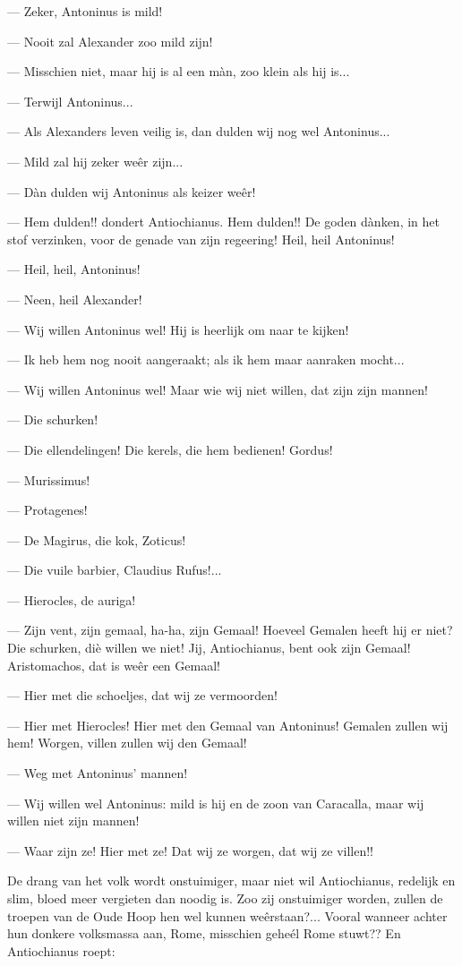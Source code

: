 \documentclass[a4paper, 12pt, oneside, dutch]{article}
\begin{document}
--- Zeker, Antoninus is mild!

--- Nooit zal Alexander zoo mild zijn!

--- Misschien niet, maar hij is al een màn, zoo klein als hij is...

--- Terwijl Antoninus...

--- Als Alexanders leven veilig is, dan dulden wij nog wel Antoninus...

--- Mild zal hij zeker weêr zijn...

--- Dàn dulden wij Antoninus als keizer weêr!

--- Hem dulden!! dondert Antiochianus. Hem dulden!! De goden dànken, in het stof verzinken, voor de genade van zijn regeering! Heil, heil Antoninus!

--- Heil, heil, Antoninus!

--- Neen, heil Alexander!

--- Wij willen Antoninus wel! Hij is heerlijk om naar te kijken!

--- Ik heb hem nog nooit aangeraakt; als ik hem maar aanraken mocht...

--- Wij willen Antoninus wel! Maar wie wij niet willen, dat zijn zijn mannen!

--- Die schurken!

--- Die ellendelingen! Die kerels, die hem bedienen! Gordus!

--- Murissimus!

--- Protagenes!

--- De Magirus, die kok, Zoticus!

--- Die vuile barbier, Claudius Rufus!...

--- Hierocles, de auriga!

--- Zijn vent, zijn gemaal, ha-ha, zijn Gemaal! Hoeveel Gemalen heeft hij er niet? Die schurken, diè willen we niet! Jij, Antiochianus, bent ook zijn Gemaal! Aristomachos, dat is weêr een Gemaal!

--- Hier met die schoeljes, dat wij ze vermoorden!

--- Hier met Hierocles! Hier met den Gemaal van Antoninus! Gemalen zullen wij hem! Worgen, villen zullen wij den Gemaal!

--- Weg met Antoninus' mannen!

--- Wij willen wel Antoninus: mild is hij en de zoon van Caracalla, maar wij willen niet zijn mannen!

--- Waar zijn ze! Hier met ze! Dat wij ze worgen, dat wij ze villen!!

De drang van het volk wordt onstuimiger, maar niet wil Antiochianus, redelijk en slim, bloed meer vergieten dan noodig is. Zoo zij onstuimiger worden, zullen de troepen van de Oude Hoop hen wel kunnen weêrstaan?... Vooral wanneer achter hun donkere volksmassa aan, Rome, misschien geheél Rome stuwt?? En Antiochianus roept:
\end{document}
